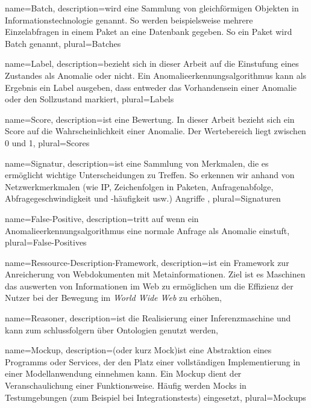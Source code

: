 {
  name={Batch},
  description={wird eine Sammlung von gleichförmigen Objekten in Informationstechnologie genannt. So werden beispielsweise mehrere Einzelabfragen in einem Paket an eine Datenbank gegeben. So ein Paket wird Batch genannt},
  plural={Batches}
}

{
  name={Label},
  description={bezieht sich in dieser Arbeit auf die Einstufung eines Zustandes als Anomalie oder nicht. Ein Anomalieerkennungsalgorithmus kann als Ergebnis ein Label ausgeben, dass entweder das Vorhandensein einer Anomalie oder den Sollzustand markiert},
  plural={Labels}
}

{
  name={Score},
  description={ist eine Bewertung. In dieser Arbeit bezieht sich ein Score auf die Wahrscheinlichkeit einer Anomalie. Der Wertebereich liegt zwischen 0 und 1},
  plural={Scores}
}

{
  name={Signatur},
  description={ist eine Sammlung von Merkmalen, die es ermöglicht wichtige Unterscheidungen zu Treffen. So erkennen wir anhand von Netzwerkmerkmalen (wie IP, Zeichenfolgen in Paketen, Anfragenabfolge, Abfragegeschwindigkeit und -häufigkeit usw.) Angriffe \cite{singh2012detecting}},
  plural={Signaturen}
}

{
  name={False-Positive},
  description={tritt auf wenn ein Anomalieerkennungsalgorithmus eine normale Anfrage als Anomalie einstuft},
  plural={False-Positives}
}

{
  name={Ressource-Description-Framework},
  description={ist ein Framework zur Anreicherung von Webdokumenten mit Metainformationen. Ziel ist es Maschinen das auswerten von Informationen im Web zu ermöglichen um die Effizienz der Nutzer bei der Bewegung im \textit{World Wide Web} zu erhöhen},
}

{
  name={Reasoner},
  description={ist die Realisierung einer Inferenzmaschine und kann zum schlussfolgern über Ontologien genutzt werden},
}

{
  name={Mockup},
  description={(oder kurz Mock)ist eine Abstraktion eines Programms oder Services, der den Platz einer vollständigen Implementierung in einer Modellanwendung einnehmen kann. Ein Mockup dient der Veranschaulichung einer Funktionsweise. Häufig werden Mocks in Testumgebungen (zum Beispiel bei Integrationstests) eingesetzt},
  plural={Mockups}
}
